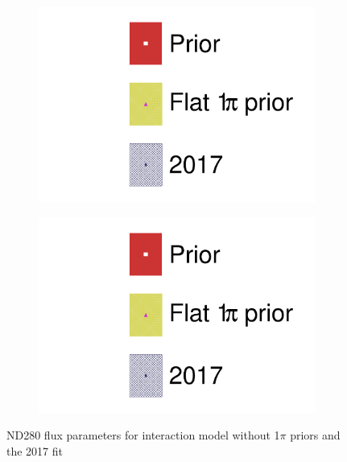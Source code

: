 \begin{figure}[h]
\begin{subfigure}[t]{0.24\textwidth}
		\includegraphics[width=\textwidth, trim={0mm 0mm 0mm 0mm}, clip,page=8]{figures/mach3/data/alt/2017b_FlatPion_Data_merg_2017b_NewData_NewDet_UpdXsecStep_2Xsec_4Det_5Flux_0.pdf}
	\end{subfigure}
	\begin{subfigure}[t]{0.24\textwidth}
		\includegraphics[width=\textwidth, trim={0mm 0mm 0mm 0mm}, clip,page=9]{figures/mach3/data/alt/2017b_FlatPion_Data_merg_2017b_NewData_NewDet_UpdXsecStep_2Xsec_4Det_5Flux_0.pdf}
	\end{subfigure}
	\caption{ND280 flux parameters for interaction model without 1$\pi$ priors and the 2017 fit}
	\label{fig:1pi_prior_flux}
\end{figure}

